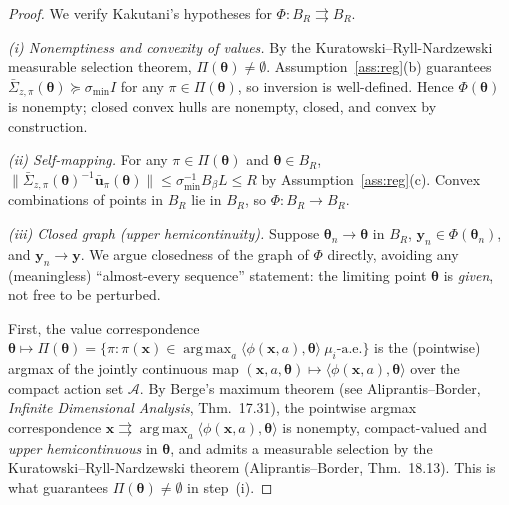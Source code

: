\documentclass[11pt]{article}
\DeclareMathOperator*{\argmax}{arg\,max}
\begin{document}
\begin{proof}
We verify Kakutani's hypotheses for $\Phi:B_R\rightrightarrows B_R$.

\emph{(i) Nonemptiness and convexity of values.}  By the
Kuratowski--Ryll-Nardzewski measurable selection theorem,
$\Pi(\bm{\theta})\neq\emptyset$.
Assumption~\ref{ass:reg}(b) guarantees
$\bar{\Sigma}_{z,\pi}(\bm{\theta})\succeq\sigma_{\min}I$
for any $\pi\in\Pi(\bm{\theta})$, so inversion is well-defined.
Hence $\Phi(\bm{\theta})$ is nonempty; closed convex hulls are
nonempty, closed, and convex by construction.

\emph{(ii) Self-mapping.}  For any $\pi\in\Pi(\bm{\theta})$ and
$\bm{\theta}\in B_R$,
$\|\bar{\Sigma}_{z,\pi}(\bm{\theta})^{-1}\bar{\bm{u}}_\pi(\bm{\theta})\|
\leq\sigma_{\min}^{-1}B_\beta L\leq R$
by Assumption~\ref{ass:reg}(c).
Convex combinations of points in $B_R$ lie in $B_R$, so $\Phi:B_R\to B_R$.

\emph{(iii) Closed graph (upper hemicontinuity).}  Suppose
$\bm{\theta}_n\to\bm{\theta}$ in $B_R$, $\bm{y}_n\in\Phi(\bm{\theta}_n)$,
and $\bm{y}_n\to\bm{y}$.  We argue closedness of the graph of $\Phi$
directly, avoiding any (meaningless) ``almost-every sequence''
statement: the limiting point $\bm{\theta}$ is \emph{given}, not free
to be perturbed.

First, the value correspondence
$\bm{\theta}\mapsto\Pi(\bm{\theta})=\{\pi:\pi(\bm{x})\in
\argmax_a\langle\phi(\bm{x},a),\bm{\theta}\rangle\ \mu_i\text{-a.e.}\}$
is the (pointwise) argmax of the jointly continuous map
$(\bm{x},a,\bm{\theta})\mapsto\langle\phi(\bm{x},a),\bm{\theta}\rangle$
over the compact action set $\mathcal{A}$.  By Berge's maximum theorem
(see Aliprantis--Border, \emph{Infinite Dimensional Analysis},
Thm.~17.31), the pointwise argmax correspondence
$\bm{x}\rightrightarrows\argmax_a\langle\phi(\bm{x},a),\bm{\theta}\rangle$
is nonempty, compact-valued and \emph{upper hemicontinuous} in
$\bm{\theta}$, and admits a measurable selection by the
Kuratowski--Ryll-Nardzewski theorem (Aliprantis--Border,
Thm.~18.13).  This is what guarantees $\Pi(\bm{\theta})\neq\emptyset$ in
step~(i).


\end{proof}
\end{document}
